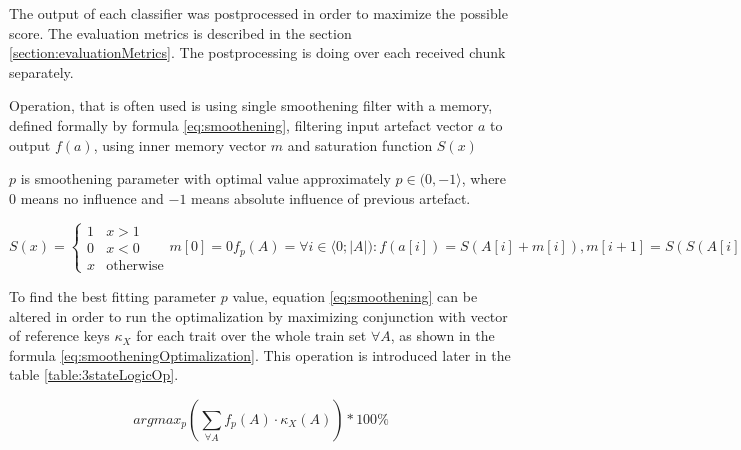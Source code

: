 The output of each classifier was postprocessed in order to maximize the possible score. The evaluation
metrics is described in the section \ref{section:evaluationMetrics}. The postprocessing is doing over each
received chunk separately.

Operation, that is often used is using single smoothening filter with a memory,
defined formally by formula \ref{eq:smoothening}, filtering input artefact vector $a$ to
output $f(a)$, using inner memory vector $m$ and saturation function $S(x)$

$p$ is smoothening parameter with optimal value approximately $p \in (0,-1\rangle$,
where 0 means no influence and $-1$ means absolute influence of previous artefact.

\begin{subequations}
\begin{equation}
S(x) =\begin{cases} 1 & x > 1           \\
                    0 & x < 0           \\
                    x & \text{otherwise}
      \end{cases}
\end{equation}
\begin{equation}
m[0] = 0
\end{equation}
\begin{equation}
f_{p}(A) = \forall i \in \langle 0;|A|):  f(a[i]) = S(A[i] + m[i]), m[i+1] = S(S(A[i] + m[i]) + |A[i]|*p)
\end{equation}
\label{eq:smoothening}
\end{subequations}

To find the best fitting parameter $p$ value, equation \ref{eq:smoothening} can be
altered in order to run the optimalization by maximizing conjunction with vector of
reference keys $\kappa_{X}$ for each trait over the whole train set $\forall A$,
as shown in the formula \ref{eq:smootheningOptimalization}.
This operation is introduced later in the table \ref{table:3stateLogicOp}.

\begin{equation}
argmax_{p} (\sum_{\forall A} f_{p}(A)\cdot \kappa_{X}(A) )* 100\%
\label{eq:smootheningOptimalization}
\end{equation}



